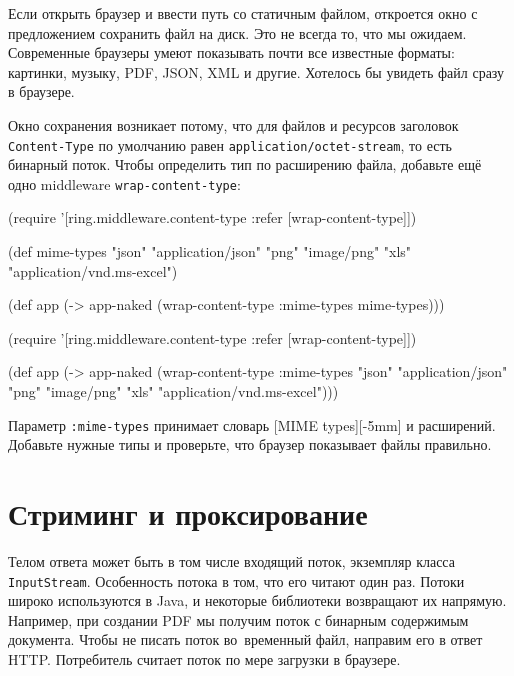 Если открыть браузер и ввести путь со статичным файлом, откроется окно с
предложением сохранить файл на диск. Это не всегда то, что мы
ожидаем. Современные браузеры умеют показывать почти все известные форматы:
картинки, музыку, PDF, JSON, XML и другие. Хотелось бы увидеть файл сразу в
браузере.

Окно сохранения возникает потому, что для файлов и ресурсов заголовок
\verb|Content-Type| по умолчанию равен \texttt{appli\-cation/\-octet\--stream}, то есть
бинарный поток. Чтобы определить тип по расширению файла, добавьте ещё одно
middleware \verb|wrap-content-type|:

\ifnarrow

\begin{english}
  \begin{clojure}
(require '[ring.middleware.content-type
           :refer [wrap-content-type]])

(def mime-types
      {"json" "application/json"
       "png" "image/png"
       "xls" "application/vnd.ms-excel"})

(def app
  (-> app-naked
      (wrap-content-type
        {:mime-types mime-types})))
  \end{clojure}
\end{english}

\else

\begin{english}
  \begin{clojure}
(require '[ring.middleware.content-type
           :refer [wrap-content-type]])

(def app
  (-> app-naked
      (wrap-content-type
       {:mime-types
         {"json" "application/json"
          "png" "image/png"
          "xls" "application/vnd.ms-excel"}})))
  \end{clojure}
\end{english}

\fi

Параметр \verb|:mime-types| принимает словарь
[MIME types][-5mm] и
расширений. Добавьте нужные типы и проверьте, что браузер показывает файлы
правильно.


\section{Стриминг и проксирование}

Телом ответа может быть в том числе входящий поток, экземпляр класса
\verb|InputStream|. Особенность потока в том, что его читают один раз. Потоки
широко используются в Java, и некоторые библиотеки возвращают их
напрямую. Например, при создании PDF мы получим поток с бинарным содержимым
документа. Чтобы не писать поток во~временный файл, направим его в ответ
HTTP. Потребитель считает поток по мере загрузки в браузере.

